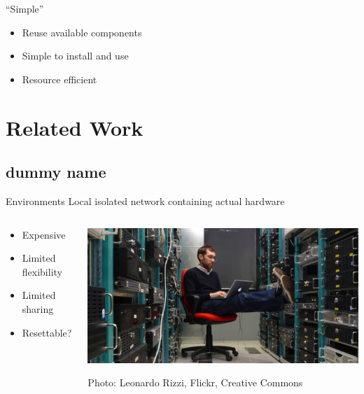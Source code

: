 \documentclass{beamer}
\begin{document}
	\begin{frame}{``Simple''}
		\begin{itemize}
			\item Reuse available components
			\item Simple to install and use
			\item Resource efficient
		\end{itemize}	
	\end{frame}

	\section{Related Work}
	\subsection{dummy name}
	\begin{frame}{Environments}
		Local isolated network containing actual hardware
		\vfill
		\begin{columns}
 		\begin{column}{0.5\textwidth}
    			\begin{itemize}
        				\item Expensive
        				\item Limited flexibility
        				\item Limited sharing
        				\item Resettable?
    			\end{itemize}
  		\end{column}

		\begin{column}{0.5\textwidth}
     			\includegraphics[width=\textwidth]{env-datacenter_rizzi.jpg}
			
			{\tiny Photo: Leonardo Rizzi, Flickr, Creative Commons}
  		\end{column}
		\end{columns}
	\end{frame}
	
\end{document}
